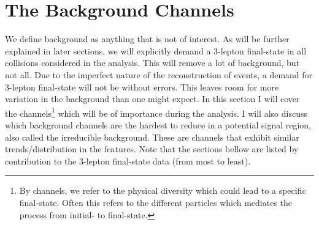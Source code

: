 \section{The Background Channels}\label{sec:bkg}
We define background as anything that is not of interest. As will be further explained in  later sections,
we will explicitly demand a 3-lepton final-state in all collisions considered in the analysis. This will 
remove a lot of background, but not all. Due to the imperfect nature of the reconstruction of events,
a demand for 3-lepton final-state will not be without errors. This leaves room for more variation in 
the background than one might expect. In this section I will cover the channels\footnote{By channels,
we refer to the physical diversity which could lead to a specific final-state. Often this refers to 
the different particles which mediates the process from initial- to final-state.} which will 
be of importance during the analysis. I will also discuss which background channels are the hardest 
to reduce in a potential signal region, also called the irreducible background. These are 
channels that exhibit similar trends/distribution in the features. Note that the sections bellow
are listed by contribution to the 3-lepton final-state data (from most to least).  

